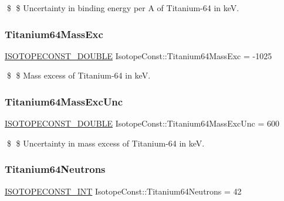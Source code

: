 \$ \$ Uncertainty in binding energy per A of Titanium-\/64 in keV. \mbox{\label{group___isotope_const-_titanium-_ti64_ga30d5f44885e1cdcac6b2a65b06624efc}} 
\subsubsection{\texorpdfstring{Titanium64\+Mass\+Exc}{Titanium64MassExc}}
{\footnotesize\ttfamily \mbox{\hyperlink{group___isotope_const-_macros_ga8f45a7272ce02c0b4c65c44636ed719a}{I\+S\+O\+T\+O\+P\+E\+C\+O\+N\+S\+T\+\_\+\+D\+O\+U\+B\+LE}} Isotope\+Const\+::\+Titanium64\+Mass\+Exc = -\/1025}

\$ \$ Mass excess of Titanium-\/64 in keV. \mbox{\label{group___isotope_const-_titanium-_ti64_gaf0d0a8808af9f2d2043abed807775163}} 
\subsubsection{\texorpdfstring{Titanium64\+Mass\+Exc\+Unc}{Titanium64MassExcUnc}}
{\footnotesize\ttfamily \mbox{\hyperlink{group___isotope_const-_macros_ga8f45a7272ce02c0b4c65c44636ed719a}{I\+S\+O\+T\+O\+P\+E\+C\+O\+N\+S\+T\+\_\+\+D\+O\+U\+B\+LE}} Isotope\+Const\+::\+Titanium64\+Mass\+Exc\+Unc = 600}

\$ \$ Uncertainty in mass excess of Titanium-\/64 in keV. \mbox{\label{group___isotope_const-_titanium-_ti64_gadaee1a9ea86119c3d379b6bbbadab545}} 
\subsubsection{\texorpdfstring{Titanium64\+Neutrons}{Titanium64Neutrons}}
{\footnotesize\ttfamily \mbox{\hyperlink{group___isotope_const-_macros_ga5f18360b3e99483a35c32d789e62621c}{I\+S\+O\+T\+O\+P\+E\+C\+O\+N\+S\+T\+\_\+\+I\+NT}} Isotope\+Const\+::\+Titanium64\+Neutrons = 42}

